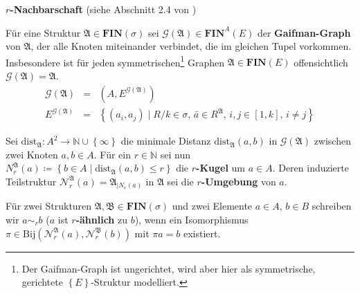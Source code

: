 \begin{defn}
\textbf{\label{def:neighborhoods}$r$-Nachbarschaft} (siehe Abschnitt
2.4 von \cite{EbbinghausFlum})

Für eine Struktur $\mathfrak{A}\in\mathbf{FIN}\left(\sigma\right)$
sei $\mathcal{G}\left(\mathfrak{A}\right)\in\mathbf{FIN}^{A}\left(E\right)$
der \textbf{Gaifman-Graph} von $\mathfrak{A}$, der alle Knoten miteinander
verbindet, die im gleichen Tupel vorkommen. Insbesondere ist für jeden
symmetrischen\footnote{Der Gaifman-Graph ist ungerichtet, wird aber hier als symmetrische,
gerichtete $\left\{ E\right\} $-Struktur modelliert.} Graphen $\mathfrak{A}\in\mathbf{FIN}\left(E\right)$ offensichtlich
$\mathcal{G}\left(\mathfrak{A}\right)=\mathfrak{A}$.
\begin{eqnarray*}
\mathcal{G}\left(\mathfrak{A}\right) & = & \left(A,E^{\mathcal{G}\left(\mathfrak{A}\right)}\right)\\
E^{\mathcal{G}\left(\mathfrak{A}\right)} & = & \left\{ \left(a_{i},a_{j}\right)\mid R/k\in\sigma,\,\bar{a}\in R^{\mathfrak{A}},\,i,j\in\left[1,k\right],\,i\neq j\right\} 
\end{eqnarray*}

Sei $\mathrm{dist}_{\mathfrak{A}}:A^{2}\rightarrow\mathbb{N\cup\left\{ \infty\right\} }$
die minimale Distanz $\mathrm{dist}_{\mathfrak{A}}\left(a,b\right)$
in $\mathcal{G}\left(\mathfrak{A}\right)$ zwischen zwei Knoten $a,b\in A$.
Für ein $r\in\mathbb{N}$ sei nun $N_{r}^{\mathfrak{A}}\left(a\right)\coloneqq\left\{ b\in A\mid\mathrm{dist}_{\mathfrak{A}}\left(a,b\right)\leqslant r\right\} $
die \textbf{$r$-Kugel} um $a\in A$. Deren induzierte Teilstruktur
$\mathcal{N}_{r}^{\mathfrak{A}}\left(a\right)=\mathfrak{A}_{\mid N_{r}\left(a\right)}$
in $\mathfrak{A}$ sei die \textbf{$r$-Umgebung} von $a$.

Für zwei Strukturen $\mathfrak{A},\mathfrak{B}\in\mathbf{FIN}\left(\sigma\right)$
und zwei Elemente $a\in A$, $b\in B$ schreiben wir $a\sim_{r}b$
($a$ ist \textbf{$r$-ähnlich} zu $b$), wenn ein Isomorphismus $\pi\in\mathrm{Bij}\left(\mathcal{N}_{r}^{\mathfrak{A}}\left(a\right),\mathcal{N}_{r}^{\mathfrak{B}}\left(b\right)\right)$
mit $\pi a=b$ existiert.
\end{defn}
%
